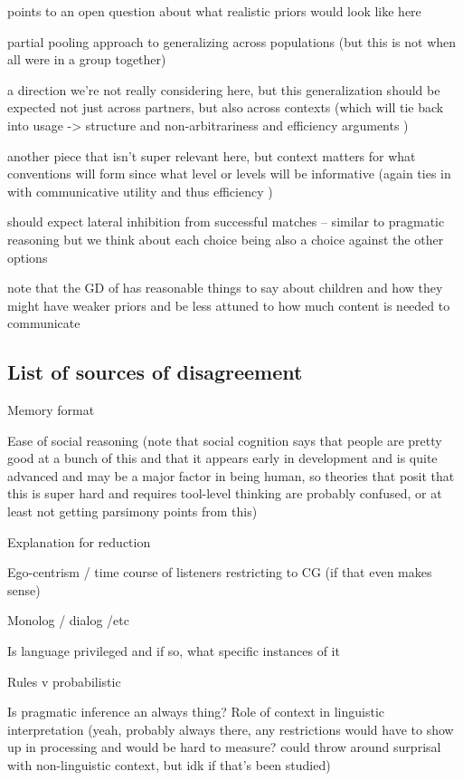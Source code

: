 \documentclass[]{article}
\begin{document}
points to an open question about what realistic priors would look like here

partial pooling approach to generalizing across populations (but this is not when all were in a group together) 

a direction we're not really considering here, but this generalization should be expected not just across partners, but also across contexts (which will tie back into usage -> structure and non-arbitrariness and efficiency arguments )

another piece that isn't super relevant here, but context matters for what conventions will form since what level or levels will be informative (again ties in with communicative utility and thus efficiency )

should expect lateral inhibition from successful matches -- similar to pragmatic reasoning but we think about each choice being also a choice against the other options 

note that the GD of \cite{hawkins2021} has reasonable things to say about children and how they might have weaker priors and be less attuned to how much content is needed to communicate 

\subsection{List of sources of disagreement}

Memory format 

Ease of social reasoning (note that social cognition says that people are pretty good at a bunch of this and that it appears early in development and is quite advanced and may be a major factor in being human, so theories that posit that this is super hard and requires tool-level thinking are probably confused, or at least not getting parsimony points from this)

Explanation for reduction

Ego-centrism / time course of listeners restricting to CG (if that even makes sense)

Monolog / dialog /etc 

Is language privileged and if so, what specific instances of it

Rules v probabilistic

Is pragmatic inference an always thing? Role of context in linguistic interpretation (yeah, probably always there, any restrictions would have to show up in processing and would be hard to measure? could throw around surprisal with non-linguistic context, but idk if that's been studied) 
\end{document}
